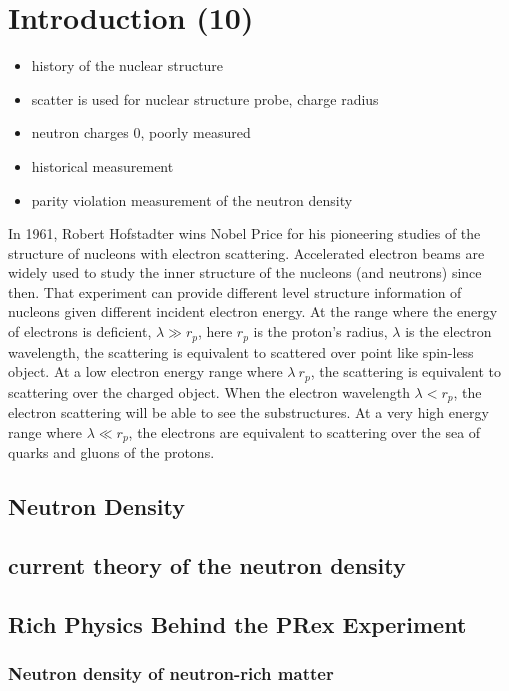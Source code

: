 \chapter{Introduction (10)}

\begin{itemize}
    \item history of the nuclear structure
    \item scatter is used for nuclear structure probe, charge radius 
    \item neutron charges 0, poorly measured
    \item historical measurement 
    \item parity violation measurement of the neutron density
\end{itemize} 

In 1961, Robert Hofstadter wins Nobel Price for his pioneering studies of the structure of nucleons with  electron scattering. Accelerated electron beams are widely used to study the inner structure of the nucleons (and neutrons) since then. That experiment can provide different level structure information of nucleons given different incident electron energy. At the range where the energy of electrons is deficient, $\lambda \gg r_p$, here $r_p$ is the proton's radius, $\lambda$ is the electron wavelength, the scattering is equivalent to scattered over point like spin-less object. At a low electron energy range where $\lambda ~r_p$, the scattering is equivalent to scattering over the charged object. When the electron wavelength $\lambda < r_p$, the electron scattering will be able to see the substructures. At a very high energy range where $\lambda \ll r_p$, the electrons are equivalent to scattering over the sea of quarks and gluons of the protons. 

\section{Neutron Density}
\section{current theory of the neutron density}

\section{Rich Physics Behind the PRex Experiment}
\subsection{Neutron density of neutron-rich matter}
